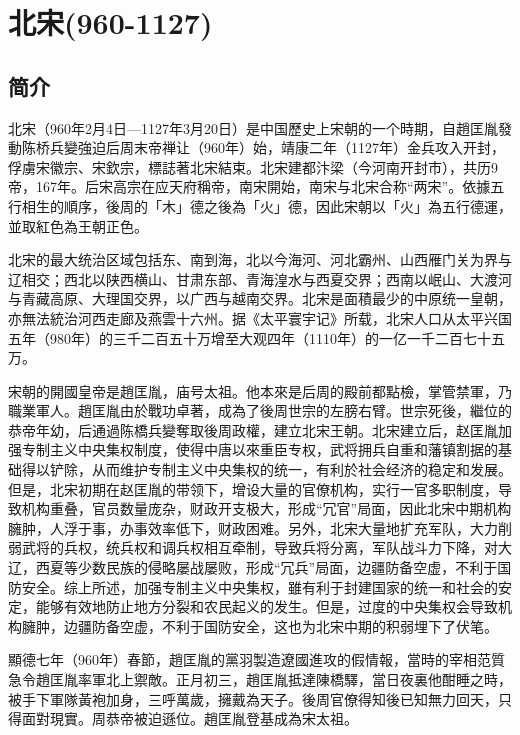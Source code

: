 
\chapter{北宋\tiny(960-1127)}

\section{简介}

北宋（960年2月4日—1127年3月20日）是中国歷史上宋朝的一个時期，自趙匡胤發動陈桥兵變強迫后周末帝禅让（960年）始，靖康二年（1127年）金兵攻入开封，俘虜宋徽宗、宋欽宗，標誌著北宋結束。北宋建都汴梁（今河南开封市），共历9帝，167年。后宋高宗在应天府稱帝，南宋開始，南宋与北宋合称“两宋”。依據五行相生的順序，後周的「木」德之後為「火」德，因此宋朝以「火」為五行德運，並取紅色為王朝正色。

北宋的最大统治区域包括东、南到海，北以今海河、河北霸州、山西雁门关为界与辽相交；西北以陕西横山、甘肃东部、青海湟水与西夏交界；西南以岷山、大渡河与青藏高原、大理国交界，以广西与越南交界。北宋是面積最少的中原统一皇朝，亦無法統治河西走廊及燕雲十六州。据《太平寰宇记》所载，北宋人口从太平兴国五年（980年）的三千二百五十万增至大观四年（1110年）的一亿一千二百七十五万。

宋朝的開國皇帝是趙匡胤，庙号太祖。他本來是后周的殿前都點檢，掌管禁軍，乃職業軍人。趙匡胤由於戰功卓著，成為了後周世宗的左膀右臂。世宗死後，繼位的恭帝年幼，后通過陈橋兵變奪取後周政權，建立北宋王朝。北宋建立后，赵匡胤加强专制主义中央集权制度，使得中唐以來重臣专权，武将拥兵自重和藩镇割据的基础得以铲除，从而维护专制主义中央集权的统一，有利於社会经济的稳定和发展。但是，北宋初期在赵匡胤的带领下，增设大量的官僚机构，实行一官多职制度，导致机构重叠，官员数量庞杂，财政开支极大，形成“冗官”局面，因此北宋中期机构臃肿，人浮于事，办事效率低下，财政困难。另外，北宋大量地扩充军队，大力削弱武将的兵权，统兵权和调兵权相互牵制，导致兵将分离，军队战斗力下降，对大辽，西夏等少数民族的侵略屡战屡败，形成“冗兵”局面，边疆防备空虚，不利于国防安全。综上所述，加强专制主义中央集权，雖有利于封建国家的统一和社会的安定，能够有效地防止地方分裂和农民起义的发生。但是，过度的中央集权会导致机构臃肿，边疆防备空虚，不利于国防安全，这也为北宋中期的积弱埋下了伏笔。

顯德七年（960年）春節，趙匡胤的黨羽製造遼國進攻的假情報，當時的宰相范質急令趙匡胤率軍北上禦敵。正月初三，趙匡胤抵達陳橋驛，當日夜裏他酣睡之時，被手下軍隊黃袍加身，三呼萬歲，擁戴為天子。後周官僚得知後已知無力回天，只得面對現實。周恭帝被迫遜位。趙匡胤登基成為宋太祖。


